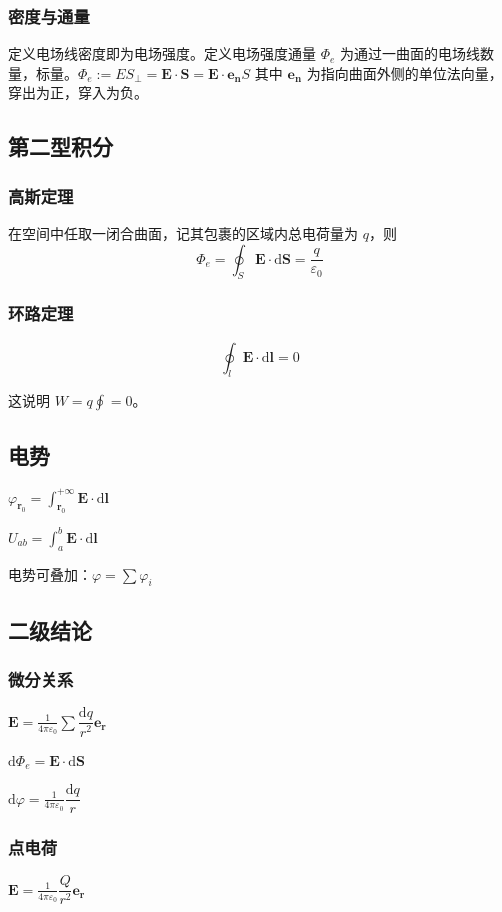 \documentclass[12pt, a4paper, UTF8, openany]{ctexbook}
\newcommand{\dif}{\mathrm{d}}
\newcommand{\vect}[1]{\mathbf{#1}}
\newcommand{\vecr}{\vect{r}}
\newcommand{\en}{\vect{e_{n}}}
\newcommand{\vecl}{\vect{l}}
\newcommand{\vecs}{\vect{S}}
\newcommand{\vece}{\vect{E}}
\newcommand{\eps}{\varepsilon}
\newcommand{\conste}{\frac{1}{4 \pi \varepsilon_0}}
\begin{document}
        \subsubsection{密度与通量}
        定义电场线密度即为电场强度。定义电场强度通量 $\Phi_e$ 为通过一曲面的电场线数量，标量。$\Phi_e := ES_{\bot} = \vece \cdot \vecs = \vece \cdot \en S$
        其中 $\en$ 为指向曲面{\heiti 外侧}的单位法向量，穿出为正，穿入为负。

        \subsection{第二型积分}
        \subsubsection{高斯定理}
        在空间中任取一闭合曲面，记其包裹的区域内总电荷量为 $q$，则
        $$\Phi_e = \oint_{S} \vece \cdot \dif \vecs = \frac{q}{\eps_0}$$

        \subsubsection{环路定理}
        $$\oint_{l} \vece \cdot \dif \vecl = 0$$

        这说明 $W = q \oint = 0$。

        \subsection{电势}
        $\varphi_{\vecr_0} = \int_{\vecr_0}^{+\infty} \vece \cdot \dif \vect{l}$

        $U_{ab} = \int_{a}^{b} \vece \cdot \dif \vect{l}$

        电势{\heiti 可叠加}：$\varphi = \sum \varphi_i$

        \subsection{二级结论}
        \subsubsection{微分关系}
        $\vece = \conste \sum \dfrac{\dif q}{r^2} \vect{e_r}$
        
        $\dif\Phi_e = \vece \cdot \dif \vecs$
        
        $\dif \varphi = \conste \dfrac{\dif q}{r}$

        \subsubsection{点电荷}
        $\vece = \conste \dfrac{Q}{r^2} \vect{e_r}$
\end{document}
